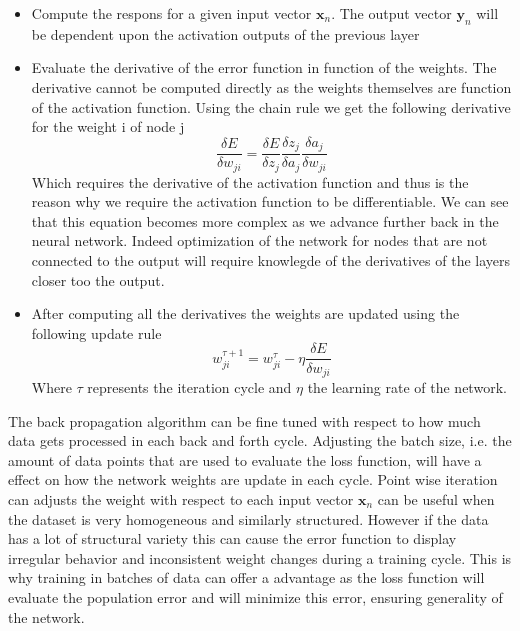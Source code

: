 \documentclass[]{article}
\begin{document}
\begin{itemize}
	\item Compute the respons for a given input vector $\textbf{x}_n$. The output vector $\textbf{y}_n$ will be dependent upon the activation outputs of the previous layer
	\item Evaluate the derivative of the error function in function of the weights. The derivative cannot be computed directly as the weights themselves are function of the activation function. Using the chain rule we get the following derivative for the weight i of node j
	\begin{equation}
		\frac{\delta E}{\delta w_{ji}} = \frac{\delta E}{\delta z_j}\frac{\delta z_j}{\delta a_j}\frac{\delta a_j}{\delta w_{ji}}
	\end{equation}
	Which  requires the derivative of the activation function and thus is the reason why we require the activation function to be differentiable. We can see that this equation becomes more complex as we advance further back in the neural network. Indeed optimization of the network for nodes that are not connected to the output will require knowlegde of the derivatives of the layers closer too the output.
	\item After computing all the derivatives the weights are updated using the following update rule
	\begin{equation}
		w_{ji}^{\tau+1} = w_{ji}^{\tau} - \eta \frac{\delta E}{\delta w_{ji}}
	\end{equation}  
	Where $\tau$ represents the iteration cycle and $\eta$ the learning rate of the network.
\end{itemize}
The back propagation algorithm can be fine tuned with respect to how much data gets processed in each back and forth cycle. Adjusting the batch size, i.e. the amount of data points that are used to evaluate the loss function, will have a effect on how the network weights are update in each cycle. Point wise iteration can adjusts the weight with respect to each input vector $\textbf{x}_n$ can be useful when the dataset is very homogeneous and similarly structured. However if the data has a lot of structural variety this can cause the error function to display irregular behavior and inconsistent weight changes during a training cycle. This is why training in batches of data can offer a advantage as the loss function will evaluate the population error and will minimize this error, ensuring generality of the network.
\\
\\
\end{document}
